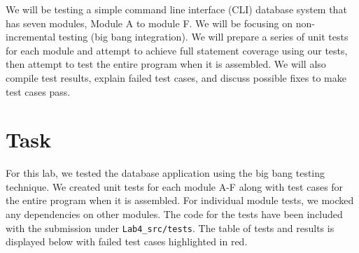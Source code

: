 \documentclass[12pt, letterpaper, titlepage]{article}
\begin{document}
We will be testing a simple command line interface (CLI) database system that has seven modules, Module A to module F. We will be focusing on non-incremental testing (big bang integration). We will prepare a series of unit tests for each module and attempt to achieve full statement coverage using our tests, then attempt to test the entire program when it is assembled. We will also compile test results, explain failed test cases, and discuss possible fixes to make test cases pass.

\section*{Task}
For this lab, we tested the database application using the big bang testing technique. We created unit tests for each module A-F along with test cases for the entire program when it is assembled. For individual module tests, we mocked any dependencies on other modules. The code for the tests have been included with the submission under \lstinline{Lab4_src/tests}. The table of tests and results is displayed below with failed test cases highlighted in red.
\end{document}
